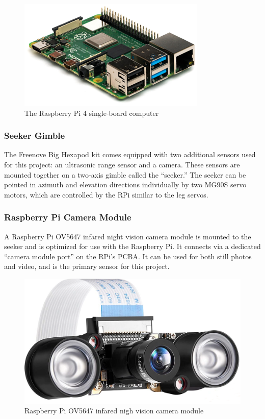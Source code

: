 \begin{figure}[H]
    \centerline{\includegraphics[scale=0.8]{figures/pi1.png}}
    \caption{The Raspberry Pi 4 single-board computer}
    \label{fig:raspberry_pi}
\end{figure}

\subsubsection{ Seeker Gimble }

The Freenove Big Hexapod kit comes equipped with two additional sensors used for this project: an ultrasonic range sensor and a camera. These sensors are mounted together on a two-axis gimble called the ``seeker.'' The seeker can be pointed in azimuth and elevation directions individually by two MG90S servo motors, which are controlled by the RPi similar to the leg servos.

\subsubsection{ Raspberry Pi Camera Module}

A Raspberry Pi OV5647 infared night vision camera module is mounted to the seeker and is optimized for use with the Raspberry Pi.  It connects via a dedicated ``camera module port'' on the RPi's PCBA. It can be used for both still photos and video, and is the primary sensor for this project.

\begin{figure}[h]
    \centering
    \includegraphics[scale=0.15]{figures/camera.png}
    \caption{Raspberry Pi OV5647 infared nigh vision camera module}
    \label{fig:raspberry_pi_cam}
\end{figure}

